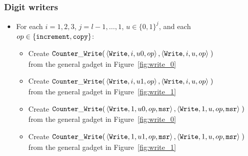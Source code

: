 \subsubsection{ Digit writers }

\begin{itemize}


    \item For each $i = 1,2,3$,
                   $j = l-1,\ldots,1$,
                   $u \in \{0, 1\}^j$, and each
                   $op \in \{{\tt increment}, {\tt copy} \}$:
        \begin{itemize}
        \item Create
        $\begin{aligned}[t]
            {\tt Counter\_Write}(& \left\langle {\tt Write}, i, u0, op \right\rangle,
                       \left\langle {\tt Write}, i, u,  op \right\rangle \;)
        \end{aligned}$ \\ from the general gadget in Figure~\ref{fig:write_0}

        \item Create
        $\begin{aligned}[t]
            {\tt Counter\_Write}(& \left\langle {\tt Write}, i,  u1, op \right\rangle,
                       \left\langle {\tt Write}, i,  u,  op \right\rangle \;)
        \end{aligned}$ \\ from the general gadget in Figure~\ref{fig:write_1}


        \item Create
        $\begin{aligned}[t]
            {\tt Counter\_Write}(& \left\langle {\tt Write}, 1, u0, op, {\tt msr} \right\rangle,
                       \left\langle {\tt Write}, 1, u,  op, {\tt msr} \right\rangle \;)
        \end{aligned}$ \\ from the general gadget in Figure~\ref{fig:write_0}

        \item Create
        $\begin{aligned}[t]
            {\tt Counter\_Write}(& \left\langle {\tt Write}, 1,  u1, op, {\tt msr} \right\rangle,
                       \left\langle {\tt Write}, 1,  u,  op, {\tt msr} \right\rangle \;)
        \end{aligned}$ \\ from the general gadget in Figure~\ref{fig:write_1}


\end{itemize}
\end{itemize}
